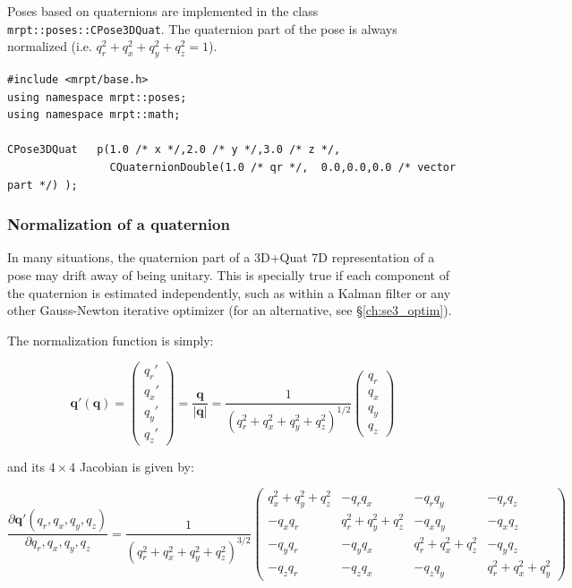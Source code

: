 \documentclass[a4paper,11pt]{report}
\begin{document}
Poses based on quaternions are implemented in the class \texttt{mrpt::poses::CPose3DQuat}. 
The quaternion part of the pose is always normalized (i.e. $q_r^2+q_x^2+q_y^2+q_z^2=1$).

\begin{lstlisting}
#include <mrpt/base.h> 
using namespace mrpt::poses; 
using namespace mrpt::math; 

CPose3DQuat   p(1.0 /* x */,2.0 /* y */,3.0 /* z */, 
                CQuaternionDouble(1.0 /* qr */,  0.0,0.0,0.0 /* vector part */) );
\end{lstlisting}


\subsubsection{Normalization of a quaternion}
\label{sect:quat:norm}

In many situations, the quaternion part of a 3D+Quat 7D representation 
of a pose may drift away of being unitary. 
This is specially true if each component of the quaternion is estimated 
independently, such as within a Kalman filter or 
any other Gauss-Newton iterative optimizer
(for an alternative, see \S\ref{ch:se3_optim}).

The normalization function is simply:

\begin{equation}
\mathbf{q'}(\mathbf{q}) 
= 
\left(
\begin{array}{c}
 q_r' \\ q_x'\\ q_y'\\ q_z'
\end{array}
\right)
= 
\frac{\mathbf{q}}{|\mathbf{q}|} 
= 
\frac{1}{(q_r^2+q_x^2+q_y^2+q_z^2)^{1/2}}
\left(
\begin{array}{c}
 q_r \\ q_x\\ q_y\\ q_z
\end{array}
\right)
\end{equation}

\noindent and its $4 \times 4$ Jacobian is given by:

\begin{equation}
\frac{\partial \mathbf{q'}(q_r,q_x,q_y,q_z)}{\partial q_r,q_x,q_y,q_z}  
=
\frac{1}{(q_r^2+q_x^2+q_y^2+q_z^2)^{3/2}}
\left( 
\begin{array}{cccc}
q_x^2 +q_y^2+q_z^2  & -q_r q_x   & -q_r q_y  & -q_r q_z  \\
-q_x q_r & q_r^2 +q_y^2+q_z^2 & -q_x q_y & - q_x q_z \\
-q_y q_r & -q_y q_x &  q_r^2 +q_x^2 +q_z^2 & -q_y q_z \\
-q_z q_r  & -q_z q_x & -q_z q_y  &  q_r^2+q_x^2+q_y^2
\end{array}
\right)
\end{equation}
\end{document}
